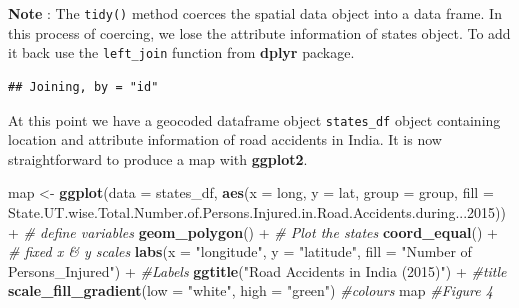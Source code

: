 \documentclass[]{article}
\newenvironment{Shaded}{}{}
\newcommand{\CommentTok}[1]{\textcolor[rgb]{0.38,0.63,0.69}{\textit{#1}}}
\newcommand{\DataTypeTok}[1]{\textcolor[rgb]{0.56,0.13,0.00}{#1}}
\newcommand{\DecValTok}[1]{\textcolor[rgb]{0.25,0.63,0.44}{#1}}
\newcommand{\KeywordTok}[1]{\textcolor[rgb]{0.00,0.44,0.13}{\textbf{#1}}}
\newcommand{\NormalTok}[1]{#1}
\newcommand{\OperatorTok}[1]{\textcolor[rgb]{0.40,0.40,0.40}{#1}}
\newcommand{\StringTok}[1]{\textcolor[rgb]{0.25,0.44,0.63}{#1}}
\begin{document}
\textbf{Note} : The \texttt{tidy()} method coerces the spatial data
object into a data frame. In this process of coercing, we lose the
attribute information of states object. To add it back use the
\texttt{left\_join} function from \textbf{dplyr} package.

\begin{Shaded}
\end{Shaded}

\begin{verbatim}
## Joining, by = "id"
\end{verbatim}

At this point we have a geocoded dataframe object \texttt{states\_df}
object containing location and attribute information of road accidents
in India. It is now straightforward to produce a map with
\textbf{ggplot2}.

\begin{Shaded}
\begin{Highlighting}[]
\NormalTok{map <-}\StringTok{ }\KeywordTok{ggplot}\NormalTok{(}\DataTypeTok{data =}\NormalTok{ states_df, }\KeywordTok{aes}\NormalTok{(}\DataTypeTok{x =}\NormalTok{ long, }\DataTypeTok{y =}\NormalTok{ lat, }\DataTypeTok{group =}\NormalTok{ group, }\DataTypeTok{fill =}\NormalTok{ State.UT.wise.Total.Number.of.Persons.Injured.in.Road.Accidents.during...}\DecValTok{2015}\NormalTok{))}\OperatorTok{+}\StringTok{ }\CommentTok{# define variables}
\StringTok{  }\KeywordTok{geom_polygon}\NormalTok{() }\OperatorTok{+}\StringTok{ }\CommentTok{# Plot the states}
\StringTok{  }\KeywordTok{coord_equal}\NormalTok{() }\OperatorTok{+}\StringTok{ }\CommentTok{# fixed x & y scales}
\StringTok{  }\KeywordTok{labs}\NormalTok{(}\DataTypeTok{x =} \StringTok{"longitude"}\NormalTok{, }\DataTypeTok{y =} \StringTok{"latitude"}\NormalTok{, }\DataTypeTok{fill =} \StringTok{"Number of Persons_Injured"}\NormalTok{) }\OperatorTok{+}\StringTok{ }\CommentTok{#Labels}
\StringTok{  }\KeywordTok{ggtitle}\NormalTok{(}\StringTok{"Road Accidents in India (2015)"}\NormalTok{) }\OperatorTok{+}\StringTok{ }\CommentTok{#title}
\StringTok{  }\KeywordTok{scale_fill_gradient}\NormalTok{(}\DataTypeTok{low =} \StringTok{"white"}\NormalTok{, }\DataTypeTok{high =} \StringTok{"green"}\NormalTok{) }\CommentTok{#colours}
\NormalTok{map }\CommentTok{#Figure 4 }
\end{Highlighting}
\end{Shaded}
\end{document}

